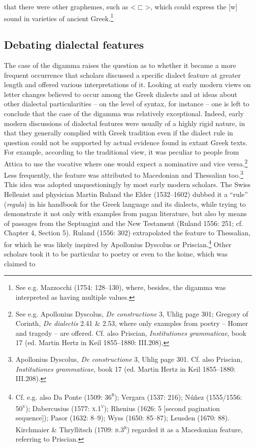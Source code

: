 \begin{styleCatalogusnotities}
that there were other graphemes, such as {\textless}${\sqsubset}${\textgreater}, which could express the [w] sound in varieties of ancient Greek.\footnote{\textrm{ See e.g. Mazzocchi (1754: 128–130), where, besides, the digamma was interpreted as having multiple values.}}
\end{styleCatalogusnotities}

\subsection{Debating dialectal features}
\hypertarget{Toc19704847}{}\begin{styleStandard}
The case of the digamma raises the question as to whether it became a more frequent occurrence that scholars discussed a specific dialect feature at greater length and offered various interpretations of it. Looking at early modern views on letter changes believed to occur among the Greek dialects and at ideas about other dialectal particularities – on the level of syntax, for instance – one is left to conclude that the case of the digamma was relatively exceptional. Indeed, early modern discussions of dialectal features were usually of a highly rigid nature, in that they generally complied with Greek tradition even if the dialect rule in question could not be supported by actual evidence found in extant Greek texts. For example, according to the traditional view, it was peculiar to people from Attica to use the vocative where one would expect a nominative and vice versa.\footnote{ See e.g. Apollonius Dyscolus, \textit{De constructione} 3, Uhlig page 301; Gregory of Corinth, \textit{De dialectis} 2.41 \& 2.53, where only examples from poetry – Homer and tragedy – are offered. Cf. also Priscian, \textit{Institutiones grammaticae}, book 17 (ed. Martin Hertz in Keil 1855–1880: III.208).} Less frequently, the feature was attributed to Macedonian and Thessalian too.\footnote{ Apollonius Dyscolus, \textit{De constructione} 3, Uhlig page 301. Cf. also Priscian, \textit{Institutiones grammaticae}, book 17 (ed. Martin Hertz in Keil 1855–1880: III.208).} This idea was adopted unquestioningly by most early modern scholars. The Swiss Hellenist and physician Martin Ruland the Elder (1532–1602) dubbed it a “rule” (\textit{regula}) in his handbook for the Greek language and its dialects, while trying to demonstrate it not only with examples from pagan literature, but also by means of passages from the Septuagint and the New Testament (Ruland 1556: 251; cf. Chapter 4, Section 5). Ruland (1556: 302) extrapolated the feature to Thessalian, for which he was likely inspired by Apollonius Dyscolus or Priscian.\footnote{ Cf. e.g. also Da Ponte (1509: 36\textsc{\textsuperscript{r}}); Vergara (1537: 216); Núñez (1555/1556: 50\textsc{\textsuperscript{v}}); Dabercusius (1577: \textsc{x.1}\textsc{\textsuperscript{v}}); Rhenius (1626: 5 [second pagination sequence]); Pasor (1632: 8–9); Wyss (1650: 85–87); Leusden (1670: 88). Kirchmaier \& Thryllitsch (1709: \textsc{b.3}\textsc{\textsuperscript{r}}) regarded it as a Macedonian feature, referring to Priscian.} Other scholars took it to be particular to poetry or even to the koine, which was claimed to 
\end{styleStandard}
